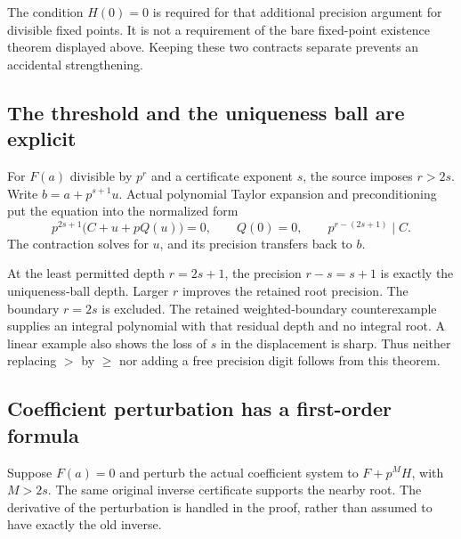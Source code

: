 The condition $H(0)=0$ is required for that additional precision argument for divisible fixed points. It is not a requirement of the bare fixed-point existence theorem displayed above. Keeping these two contracts separate prevents an accidental strengthening.

\subsection{The threshold and the uniqueness ball are explicit}
For $F(a)$ divisible by $p^r$ and a certificate exponent $s$, the source imposes $r>2s$. Write $b=a+p^{s+1}u$. Actual polynomial Taylor expansion and preconditioning put the equation into the normalized form
\[
 p^{2s+1}\bigl(C+u+pQ(u)\bigr)=0,
 \qquad Q(0)=0,
 \qquad p^{r-(2s+1)}\mid C.
\]
The contraction solves for $u$, and its precision transfers back to $b$.


At the least permitted depth $r=2s+1$, the precision $r-s=s+1$ is exactly the uniqueness-ball depth. Larger $r$ improves the retained root precision. The boundary $r=2s$ is excluded. The retained weighted-boundary counterexample supplies an integral polynomial with that residual depth and no integral root. A linear example also shows the loss of $s$ in the displacement is sharp. Thus neither replacing $>$ by $\ge$ nor adding a free precision digit follows from this theorem.

\subsection{Coefficient perturbation has a first-order formula}
Suppose $F(a)=0$ and perturb the actual coefficient system to $F+p^MH$, with $M>2s$. The same original inverse certificate supports the nearby root. The derivative of the perturbation is handled in the proof, rather than assumed to have exactly the old inverse.

